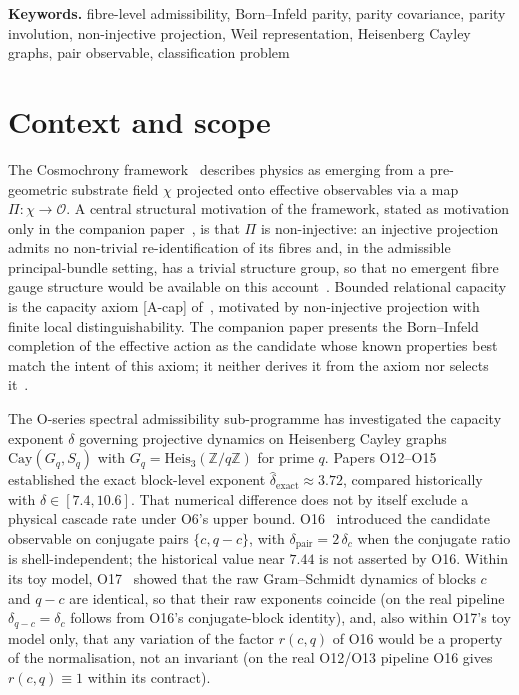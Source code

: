 \documentclass[11pt,a4paper]{article}
\newcommand{\dpair}{\delta_{\mathrm{pair}}}
\newcommand{\Heis}{\mathrm{Heis}_{3}(\mathbb{Z}/q\mathbb{Z})}
\newcommand{\Proj}{\Pi}
\newcommand{\chifield}{\chi}
\newcommand{\Obs}{\mathcal{O}}
\newcommand{\Cay}{\mathrm{Cay}}
\begin{document}
  {\small\textbf{Keywords.}
  fibre-level admissibility, Born--Infeld parity, parity covariance, parity involution,
  non-injective projection, Weil representation, Heisenberg Cayley graphs, pair observable,
  classification problem\par}

  \clearpage
  \tableofcontents

  \clearpage

  \section{Context and scope}
    \label{sec:context}

    The Cosmochrony framework~\cite{Cosmochrony} describes physics as emerging from a
    pre-geometric substrate field $\chifield$ projected onto effective observables via a map
    $\Proj:\chifield\to\Obs$.
    A central structural motivation of the framework, stated as motivation only in the companion
    paper~\cite{Beau2026c}, is that $\Proj$ is non-injective: an injective projection admits no
    non-trivial re-identification of its fibres and, in the admissible principal-bundle setting,
    has a trivial structure group, so that no emergent fibre gauge structure would be available
    on this account~\cite{Cosmochrony}.
    Bounded relational capacity is the capacity axiom [A-cap] of~\cite{Beau2026c}, motivated by
    non-injective projection with finite local distinguishability.
    The companion paper presents the Born--Infeld completion of the effective action as the
    candidate whose known properties best match the intent of this axiom; it neither derives it
    from the axiom nor selects it~\cite{Beau2026c}.

    The O-series spectral admissibility sub-programme has investigated the capacity exponent
    $\delta$ governing projective dynamics on Heisenberg Cayley graphs $\Cay(G_q,S_q)$ with
    $G_q = \Heis$ for prime $q$.
    Papers O12--O15~\cite{Beau2026a16,Beau2026a17,Beau2026a18,Beau2026a19} established the
    exact block-level exponent $\hat{\delta}_{\mathrm{exact}} \approx 3.72$,
    compared historically with $\delta\in[7.4,10.6]$.
    That numerical difference does not by itself exclude a physical cascade rate under O6’s upper bound.
    O16~\cite{Beau2026a20} introduced the candidate observable on conjugate pairs $\{c, q-c\}$, with $\dpair = 2\,\delta_c$ when the
  conjugate ratio is shell-independent; the historical value near $7.44$ is not asserted by O16.
    Within its toy model, O17~\cite{Beau2026a21} showed that the raw Gram--Schmidt
    dynamics of blocks $c$ and $q-c$ are identical, so that their raw exponents coincide (on the real
    pipeline $\delta_{q-c} = \delta_c$ follows from O16's conjugate-block identity),
    and, also within O17's toy model only, that any variation of the factor $r(c,q)$ of O16 would be a
    property of the normalisation, not an invariant (on the real O12/O13 pipeline O16 gives
    $r(c,q) \equiv 1$ within its contract).
\end{document}
